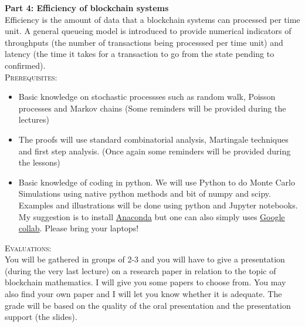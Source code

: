 \documentclass[11pt]{article}
\begin{document}
\noindent \textbf{Part 4: Efficiency of blockchain systems}\\
\noindent Efficiency is the amount of data that a blockchain systems can processed per time unit. A general queueing model is introduced to provide numerical indicators of throughputs (the number of transactions being processsed per time unit) and latency (the time it takes for a transaction to go from the state pending to confirmed).       
\\

\textsc{Prerequisites:}
\begin{itemize}  
\item Basic knowledge on stochastic processses such as random walk, Poisson processes and Markov chains (Some reminders will be provided during the lectures)  
\item The proofs will use standard combinatorial analysis, Martingale techniques and first step analysis. (Once again some reminders will be provided during the lessons)  
\item Basic knowledge of coding in python. We will use Python to do Monte Carlo Simulations using native python methods and bit of numpy and scipy. Examples and illustrations will be done using python and Jupyter notebooks. My suggestion is to install \href{https://www.anaconda.com/products/individual}{Anaconda} but one can also simply uses \href{https://colab.research.google.com/}{Google collab}. Please bring your laptops!
\end{itemize}
\textsc{Evaluations:}\\
You will be gathered in groups of 2-3 and you will have to give a presentation (during the very last lecture) on a research paper in relation to the topic of blockchain mathematics. I will give you some papers to choose from. You may also find your own paper and I will let you know whether it is adequate. The grade will be based on the quality of the oral presentation and the presentation support (the slides). 

\nocite{*}



\end{document}
